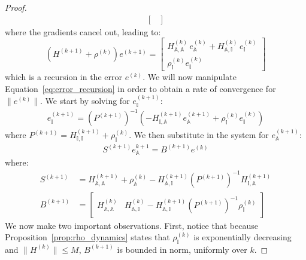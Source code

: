 \documentclass[letterpaper, 10 pt, conference]{ieeeconf}  %
\begin{document}
\begin{proof}
\begin{equation}
\begin{aligned}
\begin{bmatrix}
\end{bmatrix}
\end{aligned}
\end{equation}
where the gradients cancel out, leading to:
\begin{equation}
\label{eq:error_recursion}
(H^{(k+1)} + \rho^{(k)}) e^{(k+1)} = \begin{bmatrix}
    H^{(k)}_{\mathbb{A},\mathbb{A}}\, e_{\mathbb{A}}^{(k)} + H_{\mathbb{A}, \mathbb{I}}^{(k)} \,e_{\mathbb{I}}^{(k)} \\
    \rho_{\mathbb{I}}^{(k)} e_{\mathbb{I}}^{(k)}
\end{bmatrix}
\end{equation}
which is a recursion in the error $e^{(k)}$. We will now manipulate Equation~\eqref{eq:error_recursion} in order to obtain a rate of convergence for $\|e^{(k)}\|$. We start by solving for $e_{\mathbb{I}}^{(k+1)}$:
\begin{equation}
\label{eq:solve_I}
\begin{aligned}
    e_{\mathbb{I}}^{(k+1)} = \left(P^{(k+1)}\right)^{-1}\left( -H_{\mathbb{I}, \mathbb{A}}^{(k+1)} e_{\mathbb{A}}^{(k+1)} + \rho_{\mathbb{I}}^{(k)} e_{\mathbb{I}}^{(k)} \right)
\end{aligned}
\end{equation}
where $P^{(k+1)} = H_{\mathbb{I}, \mathbb{I}}^{(k+1)} + \rho_{\mathbb{I}}^{(k)}$. We then substitute in the system for $e_{\mathbb{A}}^{(k+1)}$:
\begin{equation}
\begin{aligned}
\label{eq:solve_A}
    S^{(k+1)} e_{\mathbb{A}}^{k+1} = B^{(k+1)} e^{(k)}
\end{aligned}
\end{equation}
where:
\begin{equation}
    \begin{aligned}
        S^{(k+1)} &= H_{\mathbb{A},\mathbb{A}}^{(k+1)} + \rho_{\mathbb{A}}^{(k)} - H^{(k+1)}_{\mathbb{A}, \mathbb{I}} (P^{(k+1)})^{-1} H_{\mathbb{I},\mathbb{A}}^{(k+1)} \\
        B^{(k+1)} &= \begin{bmatrix} H_{\mathbb{A},\mathbb{A}}^{(k)} & H_{\mathbb{A}, \mathbb{I}}^{(k)} - H_{\mathbb{A},\mathbb{I}}^{(k+1)}(P^{(k+1)})^{-1} \rho_{\mathbb{I}}^{(k)} \end{bmatrix}
    \end{aligned}
\end{equation}
We now make two important observations. First, notice that because Proposition~\ref{prop:rho_dynamics} states that $\rho_{\mathbb{I}}^{(k)}$ is exponentially decreasing and $\|H^{(k)}\| \leq M$, $B^{(k+1)}$ is bounded in norm, uniformly over $k$.

\end{proof}
\end{document}
